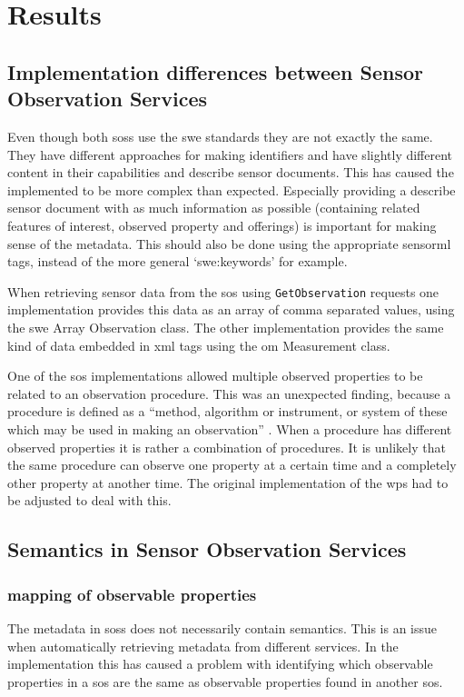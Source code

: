 

\chapter{Results}
\label{chap:results}

\section{Implementation differences between Sensor Observation Services}
Even though both \aclp{sos} use the \ac{swe} standards they are not exactly the same. They have different approaches for making identifiers and have slightly different content in their capabilities and describe sensor documents. This has caused the implemented to be more complex than expected. Especially providing a describe sensor document with as much information as possible (containing related features of interest, observed property and offerings) is important for making sense of the metadata. This should also be done using the appropriate \ac{sensorml} tags, instead of the more general `swe:keywords' for example. 

When retrieving sensor data from the \ac{sos} using \texttt{GetObservation} requests one implementation provides this data as an array of comma separated values, using the \ac{swe} Array Observation class. The other implementation provides the same kind of data embedded in \ac{xml} tags using the \ac{om} Measurement class.  

One of the \ac{sos} implementations allowed multiple observed properties to be related to an observation procedure. This was an unexpected finding, because a procedure is defined as a \enquote{method, algorithm or instrument, or system of these which may be used in making an observation} \cite[p. 4]{SW:ISO}. When a procedure has different observed properties it is rather a combination of procedures. It is unlikely that the same procedure can observe one property at a certain time and a completely other property at another time. The original implementation of the \ac{wps} had to be adjusted to deal with this.  

\section{Semantics in Sensor Observation Services}
\subsection{mapping of observable properties}
The metadata in \aclp{sos} does not necessarily contain semantics. This is an issue when automatically retrieving metadata from different services. In the implementation this has caused a problem with identifying which observable properties in a \ac{sos} are the same as observable properties found in another \ac{sos}.

